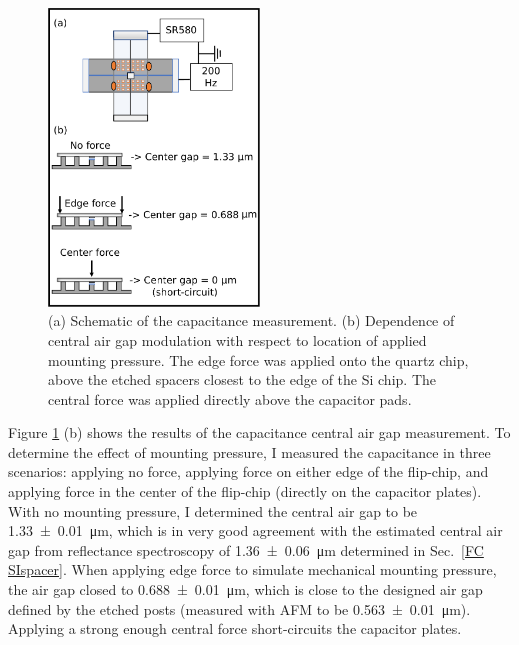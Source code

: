 \documentclass{beavtex_dub_edit}
\begin{document}
\begin{figure}
    \includegraphics[width = 0.5\textwidth]{FC capacitance measurement.pdf}
    \caption[(a) Schematic of the capacitance measurement. (b) Dependence of central air gap modulation with respect to location of applied mounting pressure. ]{(a) Schematic of the capacitance measurement. (b) Dependence of central air gap modulation with respect to location of applied mounting pressure. The edge force was applied onto the quartz chip, above the etched spacers closest to the edge of the Si chip. The central force was applied directly above the capacitor pads.}
    \label{FC cap measurement}
\end{figure}



Figure \ref{FC cap measurement} (b) shows the results of the capacitance central air gap measurement. To determine the effect of mounting pressure, I measured the capacitance in three scenarios: applying no force, applying force on either edge of the flip-chip, and applying force in the center of the flip-chip (directly on the capacitor plates). With no mounting pressure, I determined the central air gap to be \SI{1.33(1)}{\micro\meter}, which is in very good agreement with the estimated central air gap from reflectance spectroscopy of \SI{1.36(6)}{\micro\meter} determined in Sec.\ \ref{FC SIspacer}. When applying edge force to simulate mechanical mounting pressure, the air gap closed to  \SI{0.688(10)}{\micro\meter}, which is close to the designed air gap defined by the etched posts (measured with AFM to be \SI{0.563(10)}{\micro\meter}). Applying a strong enough central force short-circuits the capacitor plates. 
\end{document}
